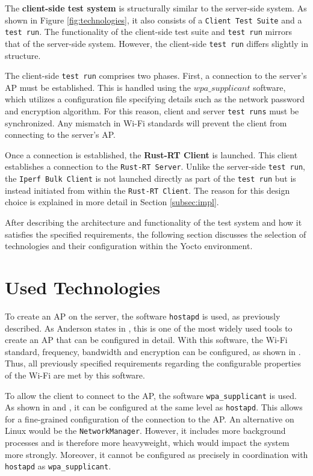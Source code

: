 The \textbf{client-side test system} is structurally similar to the server-side system. 
As shown in Figure \ref{fig:technologies}, it also consists of a \texttt{Client Test Suite} and a \texttt{test run}. 
The functionality of the client-side test suite and \texttt{test run} mirrors that of the server-side system. 
However, the client-side \texttt{test run} differs slightly in structure.

The client-side \texttt{test run} comprises two phases. 
First, a connection to the server’s \ac{AP} must be established. This is handled using the \textbf{$wpa\_supplicant$} software, which utilizes a configuration file specifying details such as the network password and encryption algorithm. 
For this reason, client and server \texttt{test runs} must be synchronized.
Any mismatch in Wi-Fi standards will prevent the client from connecting to the server’s \ac{AP}.

Once a connection is established, the \textbf{Rust-RT Client} is launched. 
This client establishes a connection to the \texttt{Rust-RT Server}. 
Unlike the server-side \texttt{test run}, the \texttt{Iperf Bulk Client} is not launched directly as part of the \texttt{test run} but is instead initiated from within the \texttt{Rust-RT Client}. 
The reason for this design choice is explained in more detail in Section \ref{subsec:impl}.

After describing the architecture and functionality of the test system and how it satisfies the specified requirements, the following section discusses the selection of technologies and their configuration within the Yocto environment.

\section{Used Technologies} \label{subsec:used_technologies}
To create an \ac{AP} on the server, the software \texttt{hostapd} is used, as previously described.  
As Anderson states in \cite{hostapd}, this is one of the most widely used tools to create an AP that can be configured in detail.  
With this software, the Wi-Fi standard, frequency, bandwidth and encryption can be configured, as shown in \cite{hostapd2}.  
Thus, all previously specified requirements regarding the configurable properties of the Wi-Fi are met by this software.  

To allow the client to connect to the AP, the software \texttt{wpa\_supplicant} is used.  
As shown in \cite{hostapd2} and \cite{wpa}, it can be configured at the same level as \texttt{hostapd}.  
This allows for a fine-grained configuration of the connection to the AP.  
An alternative on Linux would be the \texttt{NetworkManager}.  
However, it includes more background processes and is therefore more heavyweight, which would impact the system more strongly.  
Moreover, it cannot be configured as precisely in coordination with \texttt{hostapd} as \texttt{wpa\_supplicant}.  

